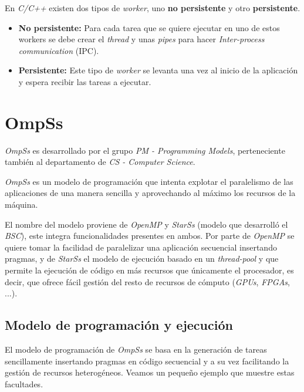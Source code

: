 En \textit{C/C++} existen dos tipos de \textit{worker}, uno \textbf{no persistente} y otro \textbf{persistente}. 

\begin{itemize}
 \item \textbf{No persistente:} Para cada tarea que se quiere ejecutar en uno de estos workers se debe crear el \textit{thread} y unas \textit{pipes} para hacer \textit{Inter-process communication} (IPC). %
 \item \textbf{Persistente:} Este tipo de \textit{worker} se levanta una vez al inicio de la aplicación y espera recibir las tareas a ejecutar.
\end{itemize}


\section{OmpSs}

\textit{OmpSs} es desarrollado por el grupo \textit{PM - Programming Models}, perteneciente también al departamento de \textit{CS - Computer Science}.
\par\bigskip

\textit{OmpSs} es un modelo de programación que intenta explotar el paralelismo de las aplicaciones de una manera sencilla y aprovechando al máximo los recursos de la máquina\cite{duran2011ompss}. 
\par\bigskip
El nombre del modelo proviene de \textit{OpenMP} y \textit{StarSs} (modelo que desarrolló el \textit{BSC}), este integra funcionalidades presentes en ambos. Por parte de \textit{OpenMP} se quiere tomar la facilidad de paralelizar una aplicación secuencial insertando pragmas, y de \textit{StarSs} el modelo de ejecución basado en un \textit{thread-pool} y que permite la ejecución de código en más recursos que únicamente el procesador, es decir, que ofrece fácil gestión del resto de recursos de cómputo (\textit{GPUs}, \textit{FPGAs}, ...)\cite{sainz2014leveraging}\cite{filgueras2013heterogeneous}.

\subsection{Modelo de programación y ejecución}

El modelo de programación de \textit{OmpSs} se basa en la generación de tareas sencillamente insertando pragmas en código secuencial y a su vez facilitando la gestión de recursos heterogéneos. Veamos un pequeño ejemplo que muestre estas facultades.

